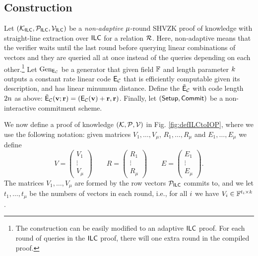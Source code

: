 \subsection{Construction}\label{ssec:constrILCtoIOP}
Let $(\mathcal{K}_{\mathsf{ILC}},\mathcal{P}_{\mathsf{ILC}},\mathcal{V}_{\mathsf{ILC}})$ be a {\em non-adaptive} $\mu$-round SHVZK proof of knowledge with straight-line extraction over $\mathsf{ILC}$ for a relation $\mathcal{R}$. Here, non-adaptive means that the verifier waits until the last round before querying linear combinations of vectors and they are queried all at once instead of the queries depending on each other.\footnote{The construction can be easily modified to an adaptive $\mathsf{ILC}$ proof. For each round of queries in the $\mathsf{ILC}$ proof, there will one extra round in the compiled proof.}
 Let $\text{Gen}_{\mathsf{E}_{\mathcal{C}}}$ be a generator that given field $\mathbb{F}$ and length parameter $k$ outputs a constant rate linear code $\mathsf{E}_{\mathcal{C}}$ that is efficiently computable given its description, and has linear minumum distance. Define the $\tilde{\mathsf{E}}_{\mathcal{C}}$ with code length $2n$ as above:  $\tilde{\mathsf{E}}_{\mathcal{C}}({\mathbf{v}};\mathbf{r})=(\mathsf{E}_{\mathcal{C}}({\mathbf{v}})+\mathbf{r},\mathbf{r})$. Finally, let $(\mathsf{Setup},\mathsf{Commit})$ be a non-interactive commitment scheme.

We now define a proof of knowledge $(\mathcal{K},\mathcal{P},\mathcal{V})$ in Fig. \ref{fig:defILCtoIOP}, where we use the following notation:
given matrices $V_1,\dots, V_\mu$, $R_1,\ldots,R_\mu$ and $E_1,\ldots,E_\mu$ we define $$V=\left(\begin{matrix}V_1\\ \vdots \\ V_\mu\end{matrix}\right) \qquad R=\left(\begin{matrix}R_1\\ \vdots \\ R_\mu\end{matrix}\right) \qquad E=\left(\begin{matrix}E_1\\ \vdots \\ E_\mu\end{matrix}\right).$$ 
The matrices $V_1,\ldots,V_\mu$ are formed by the row vectors $\mathcal{P}_{\mathsf{ILC}}$ commits to, and we let $t_1,\ldots,t_\mu$ be the numbers of vectors in each round, i.e., for all $i$ we have $V_i\in \mathbb{F}^{t_i \times k}$.  


